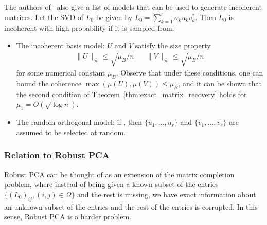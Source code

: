 The authors of~\cite{Candes:2009uq} also give a list of models that can be used to generate incoherent matrices. Let the SVD of $L_0$ be given by $L_0 = \sum_{k=1}^r \sigma_k u_k v_k^*$. Then $L_0$ is incoherent with high probability if it is sampled from:
\begin{itemize}
\item The incoherent basis model: $U$ and $V$ satisfy the size property
\[
\begin{aligned}
\|U\|_\infty \leq \sqrt{\mu_B/n} && \|V\|_\infty \leq \sqrt{\mu_B/n}
\end{aligned}
\]
for some numerical constant $\mu_B$. Observe that under these conditions, one can bound the coherence $\max (\mu(U), \mu(V)) \leq \mu_B$, and it can be shown that the second condition of Theorem~\ref{thm:exact_matrix_recovery} holds for $\mu_1 = O(\sqrt{\log n})$.

\item The random orthogonal model: if , then $\{u_1, \dots, u_r\}$ and $\{v_1, \dots, v_r\}$ are assumed to be selected at random.
\end{itemize}



\subsubsection{Relation to Robust PCA}
%
Robust PCA can be thought of as an extension of the matrix completion problem, where instead of being given a known subset of the entries $\{(L_0)_{ij}, (i,j)\in \Omega\}$ and the rest is missing, we have exact information about an unknown subset of the entries and the rest of the entries is corrupted. In this sense, Robust PCA is a harder problem.


